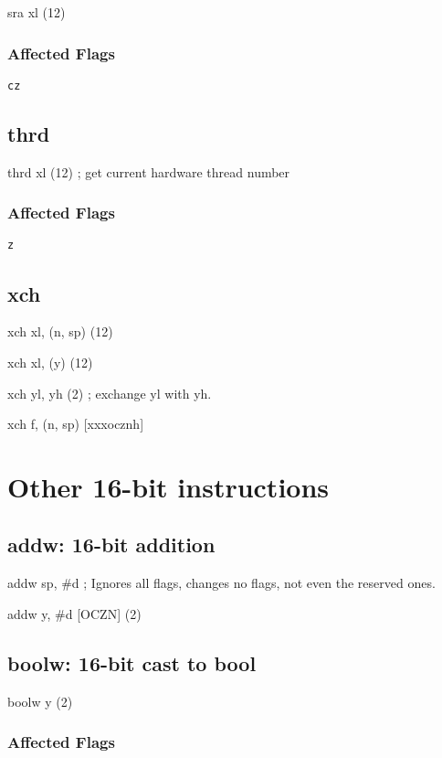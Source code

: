 \documentclass{book}
\begin{document}
sra xl (12)

\subsubsection*{Affected Flags}

\texttt{cz}


\subsection{thrd}

thrd xl (12) ; get current hardware thread number

\subsubsection*{Affected Flags}

\texttt{z}


\subsection{xch}

xch xl, (n, sp) (12)

xch xl, (y) (12)

xch yl, yh (2)            ; exchange yl with yh.

xch f, (n, sp) [xxxocznh]

\section{Other 16-bit instructions}

\subsection{addw: 16-bit addition}

addw sp, \#d            ; Ignores all flags, changes no flags, not even the reserved ones.

addw y, \#d [OCZN] (2)


\subsection{boolw: 16-bit cast to bool}

boolw y (2)

\subsubsection*{Affected Flags}
\end{document}
